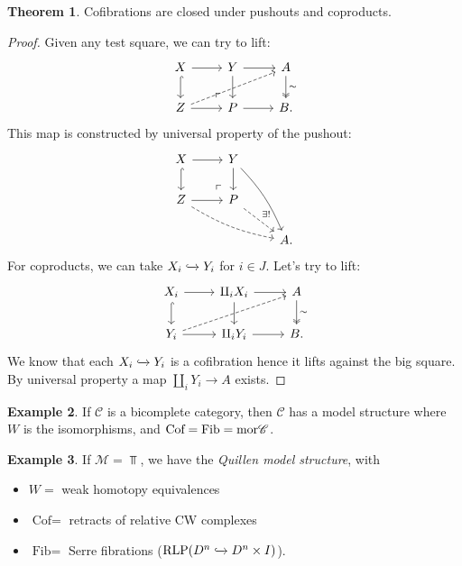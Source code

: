 \documentclass[12pt]{amsart}
\theoremstyle{definition}
\newtheorem{theorem}{Theorem}[section]
\newtheorem{example}[theorem]{Example}
\providecommand{\Cof}{\text{Cof}}
\providecommand{\Fib}{\text{Fib}}
\providecommand{\RLP}{\text{RLP}}
\begin{document}
\begin{theorem} Cofibrations are closed under pushouts and coproducts.
\end{theorem}
\begin{proof} Given any test square, we can try to lift:
\[\begin{tikzcd}
    X\rar\dar[hook] & Y\rar\dar & A\dar[two heads,"\sim" right]\\
    Z\rar\ar[urr,dashed] & P\rar\po & B.
\end{tikzcd} \]
This map is constructed by universal property of the pushout:
\[ \begin{tikzcd}
    X\rar\dar[hook] & Y\dar\ar[ddr,bend left=10] & \\
    Z\rar\ar[drr,bend right=10,dashed] & P\po\ar[dr,dashed,"\exists!" above right] & \\
     &  & A.
\end{tikzcd} \]
For coproducts, we can take $X_i \xhookrightarrow{} Y_i$ for $i\in J$. Let's try to lift:
\[ \begin{tikzcd}
    X_i\dar[hook]\rar & \amalg_i X_i\dar\rar & A\dar[two heads,"\sim" right]\\
    Y_i\rar\ar[urr,dashed] & \amalg_i Y_i\rar & B.
\end{tikzcd} \]
We know that each $X_i\xhookrightarrow{} Y_i$ is a cofibration hence it lifts against the big square. By universal property a map $\amalg_i Y_i \to A$ exists.
\end{proof}


\begin{example} If $\mathscr{C}$ is a bicomplete category, then $\mathscr{C}$ has a model structure where $W$ is the isomorphisms, and $\Cof = \Fib = \mor \mathscr{C}$.
\end{example}

\begin{example} If $\mathcal{M} = \Top$, we have the \textit{Quillen model structure}, with
\begin{itemize}
    \item $W=$ weak homotopy equivalences
    \item $\Cof=$ retracts of relative CW complexes
    \item $\Fib=$ Serre fibrations ($\RLP(D^n \hookto D^n \times I)$).
\end{itemize}
\end{example}
\end{document}
